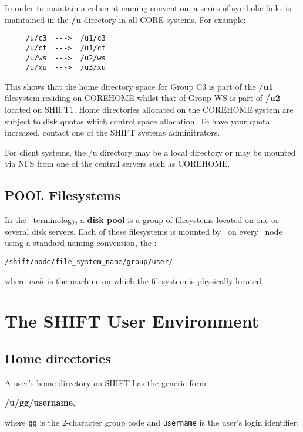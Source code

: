 In order to maintain a coherent naming convention, a series of
symbolic links is maintained in the
{\bf /u}
directory in all CORE systems. For example:
 
\begin{center}
\begin{verbatim}
     /u/c3  --->  /u1/c3
     /u/ct  --->  /u1/ct
     /u/ws  --->  /u2/ws
     /u/xu  --->  /u3/xu
\end{verbatim}
\end{center}
 
This shows that the home directory space for Group C3
is part of the
{\bf /u1}
filesystem residing on COREHOME whilst
that of Group WS is part of
{\bf /u2}
located on SHIFT1.
Home directories allocated on the COREHOME system are subject
to disk quotas which control space allocation.
To have your quota increased, contact one of the SHIFT
systems adminitrators.
 
For client systems, the /u directory may be a local directory
or may be mounted via NFS from one of the central servers such as COREHOME.
 
\section {POOL Filesystems}
 
In the \shift\ terminology, a {\bf disk pool}
is a group of filesystems located on one or several disk servers.
Each of these filesystems is mounted by \NFS\ on every \shift\ node
using a standard naming convention, the \nfspn:
 
{\tt /shift/node/file\_system\_name/group/user/\usppn}
 
where {\it node} is the machine on which the filesystem is physically located.
 
 
\chapter{The SHIFT User Environment}
 
\section {Home directories}
A user's home directory on SHIFT has the generic form:
\begin {center}
{\bf /u/gg/username},
\end {center}
 
where
{\tt gg}
is the 2-character group code and
{\tt username}
is the user's login identifier.
 
